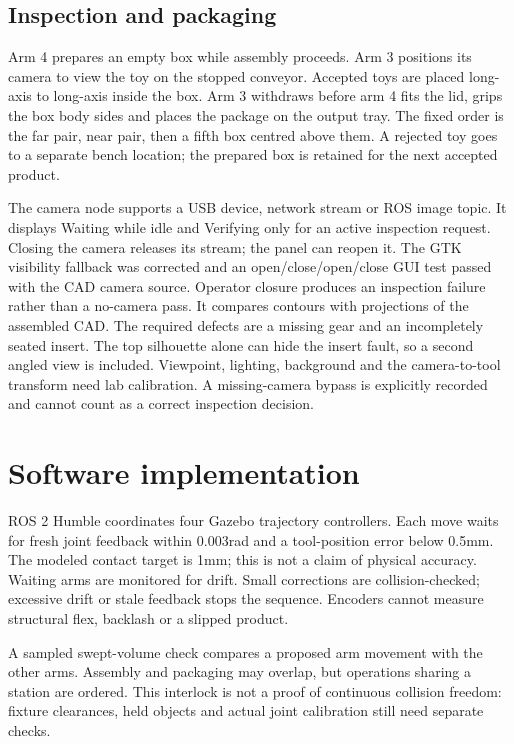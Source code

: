\documentclass{article}
\begin{document}
\subsection{Inspection and packaging}
Arm 4 prepares an empty box while assembly proceeds. Arm 3 positions its camera to view the toy on the stopped conveyor. Accepted toys are placed long-axis to long-axis inside the box. Arm 3 withdraws before arm 4 fits the lid, grips the box body sides and places the package on the output tray. The fixed order is the far pair, near pair, then a fifth box centred above them. A rejected toy goes to a separate bench location; the prepared box is retained for the next accepted product.

The camera node supports a USB device, network stream or ROS image topic. It displays Waiting while idle and Verifying only for an active inspection request. Closing the camera releases its stream; the panel can reopen it. The GTK visibility fallback was corrected and an open/close/open/close GUI test passed with the CAD camera source. Operator closure produces an inspection failure rather than a no-camera pass. It compares contours with projections of the assembled CAD. The required defects are a missing gear and an incompletely seated insert. The top silhouette alone can hide the insert fault, so a second angled view is included. Viewpoint, lighting, background and the camera-to-tool transform need lab calibration. A missing-camera bypass is explicitly recorded and cannot count as a correct inspection decision.

\section{Software implementation}
ROS 2 Humble coordinates four Gazebo trajectory controllers. Each move waits for fresh joint feedback within 0.003rad and a tool-position error below 0.5mm. The modeled contact target is 1mm; this is not a claim of physical accuracy. Waiting arms are monitored for drift. Small corrections are collision-checked; excessive drift or stale feedback stops the sequence. Encoders cannot measure structural flex, backlash or a slipped product.

A sampled swept-volume check compares a proposed arm movement with the other arms. Assembly and packaging may overlap, but operations sharing a station are ordered. This interlock is not a proof of continuous collision freedom: fixture clearances, held objects and actual joint calibration still need separate checks.
\end{document}

